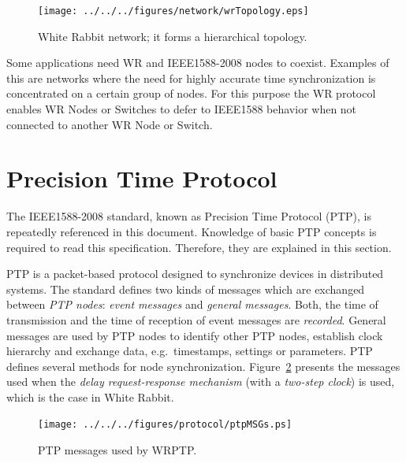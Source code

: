 \documentclass[a4paper, 12pt]{article}
\begin{document}
\begin{figure}[ht!]
  \centering
  \texttt{[image: ../../../figures/network/wrTopology.eps]}
  \caption{White Rabbit network; it forms a hierarchical topology.}
  \label{fig:wrNetwork}
\end{figure}

Some applications need WR and IEEE1588-2008 nodes to coexist. Examples
of this are networks where the need for highly accurate time synchronization is concentrated on a
certain group of nodes. For this purpose the WR protocol enables WR Nodes or Switches 
to defer to IEEE1588 behavior when not connected to another WR Node or Switch.




\newpage

\section{Precision Time Protocol}
\label{sec:ptp}

The IEEE1588-2008 standard, known as Precision Time Protocol (PTP), 
is repeatedly referenced in this document. Knowledge of basic PTP concepts is 
required to read this specification. Therefore, they are explained in this section. 

PTP is a packet-based protocol designed to synchronize devices in distributed systems. 
The standard defines two kinds of messages which are exchanged between \textit{PTP nodes}: 
\textit{event messages} and \textit{general messages}. Both, the time of transmission and 
the time of reception of event messages are \textit{recorded}. General messages 
are used by PTP nodes to identify other PTP nodes, establish clock hierarchy and 
exchange data, e.g.~timestamps, settings or parameters. PTP defines several methods 
for node synchronization. Figure~\ref{fig:wrPTPmsgs} presents the messages used when 
the \textit{delay request-response mechanism} (with a \textit{two-step clock}) is used, 
which is the case in White Rabbit. 

\begin{figure}[ht!]
  \centering
  \texttt{[image: ../../../figures/protocol/ptpMSGs.ps]}
  \caption{PTP messages used by WRPTP.}
  \label{fig:wrPTPmsgs}
\end{figure}
\end{document}
